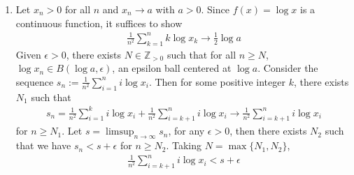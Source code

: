 \documentclass[a4paper,12pt]{article}
\theoremstyle{definition}
\begin{document}
\begin{enumerate}
\item Let $x_n >0$ for all $n$ and $x_n \to a$ with $a >0$. Since $f(x) = \log x$ is a continuous function, it suffices to show
\begin{align*}
\frac{1}{n^2}\sum_{k=1}^{n}k\log x_k \to \frac{1}{2}\log a
\end{align*}
Given $\epsilon >0$, there exists $N \in \mathbb{Z}_{>0}$ such that for all $n \geq N$, $\log x_n \in B(\log a,\epsilon)$, an epsilon ball centered at $\log a$. Consider the sequence $s_n:=\frac{1}{n^2}\sum_{i=1}^{n}i\log x_i$. Then for some positive integer $k$, there exists $N_1$ such that 
\begin{align*}
s_n = \frac{1}{n^2}\sum_{i=1}^{k}i\log x_i+\frac{1}{n^2}\sum_{i=k+1}^{n}i\log x_i \to \frac{1}{n^2}\sum_{i=k+1}^{n}i\log x_i 
\end{align*}
for $n \geq N_1$. Let $s = \limsup_{n\to \infty}s_n$, for any $\epsilon >0$, then there exists $N_2$ such that we have $s_n < s + \epsilon$ for $n \geq N_2$. Taking $N = \max\{N_1, N_2\}$,
\begin{align*}
\frac{1}{n^2}\sum_{i=k+1}^{n}i\log x_i < s + \epsilon
\end{align*}
%
%



\end{enumerate}
\end{document}
